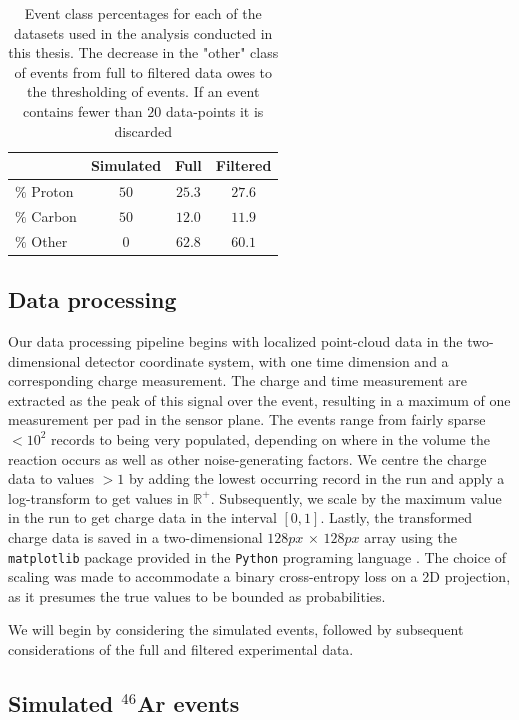 \documentclass[preprint,12pt]{elsarticle}
\newcommand{\R}{\mathbb{R}}
\begin{document}
\begin{table}
\centering
\caption{Event class percentages for each of the datasets used in the analysis conducted in this thesis. The decrease in the "other" class of events from full to filtered data owes to the thresholding of events. If an event contains fewer than $20$ data-points it is discarded}\label{tab:class_distr}
\begin{tabular}{lccc}
\toprule
{} & Simulated & Full & Filtered \\
\midrule
$\%$ Proton & $50$ & $25.3$ & $27.6$ \\ 
$\%$ Carbon & $50$ & $12.0$ & $11.9$ \\
$\%$ Other & $0$ & $62.8$ & $60.1$ \\
\end{tabular}
\end{table}

\subsection{Data processing}

Our data processing pipeline begins with localized point-cloud data in the two-dimensional detector coordinate system, with one time dimension and a corresponding charge measurement. The charge and time measurement are extracted as the peak of this signal over the event, resulting in a maximum of one measurement per pad in the sensor plane. The events range from fairly sparse $< 10^2$ records to being very populated, depending on where in the volume the reaction occurs as well as other noise-generating factors. We centre the charge data to values $>1$ by adding the lowest occurring record in the run and apply a log-transform to get values in $\R^+$. Subsequently, we scale by the maximum value in the run to get charge data in the interval $[0, 1]$. Lastly, the transformed charge data is saved in a two-dimensional $128px\, \times \,128px$ array using the \lstinline{matplotlib} package provided in the \lstinline{Python} programing language \cite{matplotlib}. The choice of scaling was made to accommodate a binary cross-entropy loss on a 2D projection, as it presumes the true values to be bounded as probabilities.

We will begin by considering the simulated events, followed by subsequent considerations of the full and filtered experimental data.

\subsection{Simulated \texorpdfstring{${}^{46}$Ar}{46Ar}  events}\label{sec:data_sim}
\end{document}
